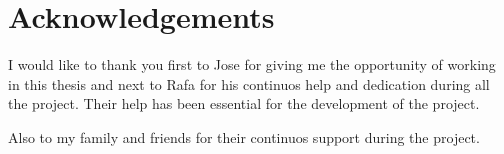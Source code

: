 \section*{Acknowledgements}
I would like to thank you first to Jose for giving me the opportunity of working in this thesis
and next to Rafa for his continuos help and dedication during all the project. Their help has
been essential for the development of the project.

Also to my family and friends for their continuos support during the project.




